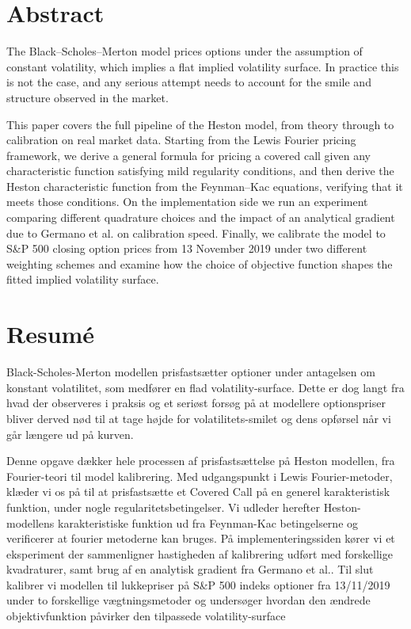 \documentclass[11pt]{article}
\theoremstyle{remark}
\theoremstyle{plain}
\begin{document}
\section*{Abstract}
The Black--Scholes--Merton model prices options under the assumption of constant volatility, which implies a flat implied volatility surface. In practice this is not the case, and any serious attempt needs to account for the smile and structure observed in the market.

This paper covers the full pipeline of the Heston model, from theory through to calibration on real market data. Starting from the Lewis \cite{lewis2001}  Fourier pricing framework, we derive a general formula for pricing a covered call given any characteristic function satisfying mild regularity conditions, and then derive the Heston characteristic function from the Feynman--Kac equations, verifying that it meets those conditions. On the implementation side we run an experiment comparing different quadrature choices and the impact of an analytical gradient due to Germano et al.\cite{germano2017} on calibration speed. Finally, we calibrate the model to S\&P 500 closing option prices from 13 November 2019 under two different weighting schemes and examine how the choice of objective function shapes the fitted implied volatility surface.

\newpage
\section*{Resumé}
Black-Scholes-Merton modellen prisfastsætter optioner under antagelsen om konstant volatilitet, som medfører en flad volatility-surface. Dette er dog langt fra hvad der observeres i praksis og et seriøst forsøg på at modellere optionspriser 
bliver derved nød til at tage højde for volatilitets-smilet og dens opførsel når vi går længere ud på kurven.

Denne opgave dækker hele processen af prisfastsættelse på Heston modellen, fra Fourier-teori til model kalibrering. Med udgangspunkt i Lewis \cite{lewis2001} Fourier-metoder, 
klæder vi os på til at prisfastsætte et Covered Call på en generel karakteristisk funktion, under nogle regularitetsbetingelser. Vi udleder herefter Heston-modellens karakteristiske funktion ud fra Feynman-Kac betingelserne og verificerer at fourier metoderne kan bruges. 
På implementeringssiden kører vi et eksperiment der sammenligner hastigheden af kalibrering udført med forskellige kvadraturer, samt brug af en analytisk gradient fra Germano et al.\cite{germano2017}. Til slut kalibrer vi modellen til lukkepriser på S\&P 500 indeks optioner fra 13/11/2019 under to forskellige vægtningsmetoder og undersøger hvordan den ændrede objektivfunktion påvirker den tilpassede volatility-surface
\end{document}
